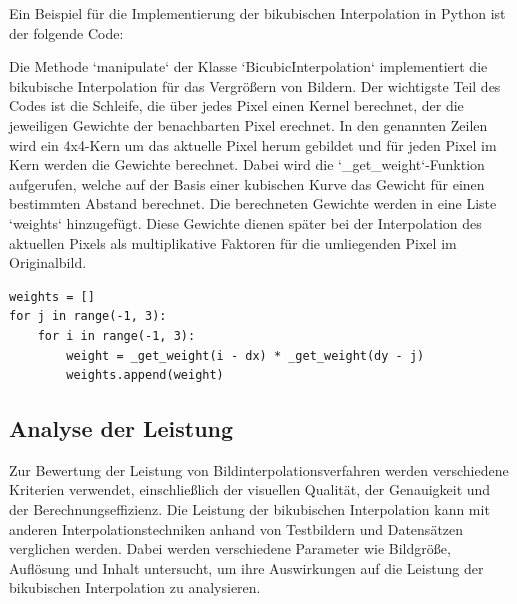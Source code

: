 Ein Beispiel für die Implementierung der bikubischen Interpolation in Python ist der folgende Code:

Die Methode `manipulate` der Klasse `BicubicInterpolation` implementiert die bikubische Interpolation für das Vergrößern von Bildern.
Der wichtigste Teil des Codes ist die Schleife, die über jedes Pixel einen Kernel berechnet, der die jeweiligen Gewichte der benachbarten Pixel erechnet.
In den genannten Zeilen wird ein 4x4-Kern um das aktuelle Pixel herum gebildet und für jeden Pixel im Kern werden die Gewichte berechnet.
Dabei wird die `\_get\_weight`-Funktion aufgerufen, welche auf der Basis einer kubischen Kurve das Gewicht für einen bestimmten Abstand berechnet.
Die berechneten Gewichte werden in eine Liste `weights` hinzugefügt.
Diese Gewichte dienen später bei der Interpolation des aktuellen Pixels als multiplikative Faktoren für die umliegenden Pixel im Originalbild.


\begin{lstlisting}
weights = []
for j in range(-1, 3):
    for i in range(-1, 3):
        weight = _get_weight(i - dx) * _get_weight(dy - j)
        weights.append(weight)
\end{lstlisting}

\subsection{Analyse der Leistung}

    Zur Bewertung der Leistung von Bildinterpolationsverfahren werden verschiedene Kriterien verwendet, einschließlich der visuellen Qualität, der Genauigkeit und der Berechnungseffizienz. 
    Die Leistung der bikubischen Interpolation kann mit anderen Interpolationstechniken anhand von Testbildern und Datensätzen verglichen werden. 
    Dabei werden verschiedene Parameter wie Bildgröße, Auflösung und Inhalt untersucht, um ihre Auswirkungen auf die Leistung der bikubischen Interpolation zu analysieren. %



